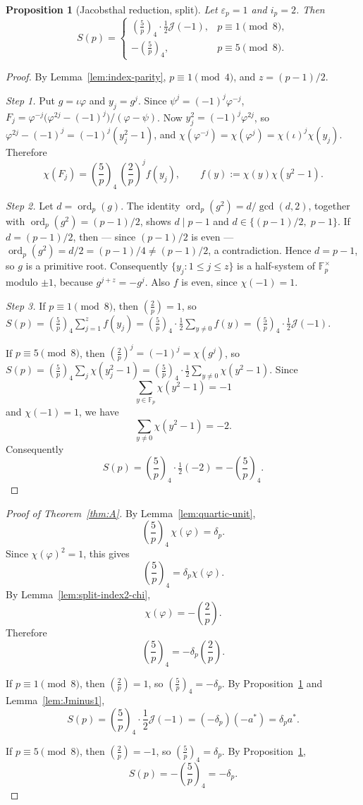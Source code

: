 \documentclass[11pt]{amsart}
\theoremstyle{plain}
\newtheorem{proposition}[theorem]{Proposition}
\theoremstyle{definition}
\newcommand{\Fp}{\mathbb{F}_p}
\newcommand{\leg}[2]{\left(\frac{#1}{#2}\right)}
\newcommand{\qleg}[2]{\left(\frac{#1}{#2}\right)_{\!4}}
\newcommand{\Jac}{\mathcal{J}}
\begin{document}
\begin{proposition}[Jacobsthal reduction, split]\label{prop:split-red}
Let $\varepsilon_p=1$ and $i_p=2$. Then
\[
  S(p)=\begin{cases}\qleg5p\cdot\tfrac12\Jac(-1), & p\equiv1\pmod8,\\[2pt] -\qleg5p, & p\equiv5\pmod8.\end{cases}
\]
\end{proposition}
\begin{proof}
By Lemma~\ref{lem:index-parity}, $p\equiv1\pmod4$, and $z=(p-1)/2$.

\emph{Step 1.} Put $g=\iota\varphi$ and $y_j=g^j$. Since
$\psi^j=(-1)^j\varphi^{-j}$,
$F_j=\varphi^{-j}\bigl(\varphi^{2j}-(-1)^j\bigr)/(\varphi-\psi)$. Now
$y_j^2=(-1)^j\varphi^{2j}$, so $\varphi^{2j}-(-1)^j=(-1)^j(y_j^2-1)$, and
$\chi(\varphi^{-j})=\chi(\varphi^{j})=\chi(\iota)^j\chi(y_j)$. Therefore
\[
  \chi(F_j)=\qleg5p\,\leg2p^{j} f(y_j),\qquad f(y):=\chi(y)\chi(y^2-1).
\]

\emph{Step 2.} Let $d=\operatorname{ord}_p(g)$. The identity
$\operatorname{ord}_p(g^2)=d/\gcd(d,2)$, together with
$\operatorname{ord}_p(g^2)=(p-1)/2$, shows $d\mid p-1$ and
$d\in\{(p-1)/2,\;p-1\}$. If $d=(p-1)/2$, then --- since $(p-1)/2$ is even
--- $\operatorname{ord}_p(g^2)=d/2=(p-1)/4\neq(p-1)/2$, a contradiction.
Hence $d=p-1$, so $g$ is a primitive root.
Consequently $\{y_j:1\le j\le z\}$ is a half-system of $\mathbb F_p^\times$
modulo $\pm1$, because $g^{j+z}=-g^j$. Also $f$ is even, since $\chi(-1)=1$.

\emph{Step 3.} If $p\equiv1\pmod 8$, then $\leg2p=1$, so
$S(p)=\qleg5p\sum_{j=1}^{z}f(y_j)=\qleg5p\cdot\tfrac12\sum_{y\neq0}f(y)
=\qleg5p\cdot\tfrac12\Jac(-1)$.

If $p\equiv5\pmod8$, then $\leg2p^{j}=(-1)^j=\chi(g^j)$, so
$S(p)=\qleg5p\sum_{j}\chi(y_j^2-1)=\qleg5p\cdot\tfrac12\sum_{y\ne0}\chi(y^2-1)$.
Since
\[
  \sum_{y\in\Fp}\chi(y^2-1)=-1
\]
and $\chi(-1)=1$, we have
\[
  \sum_{y\ne0}\chi(y^2-1)=-2.
\]
Consequently
\[
  S(p)=\qleg5p\cdot\tfrac12(-2)=-\qleg5p.
\]
\end{proof}

\begin{proof}[Proof of Theorem~\ref{thm:A}]
By Lemma~\ref{lem:quartic-unit},
\[
  \qleg5p\,\chi(\varphi)=\delta_p.
\]
Since $\chi(\varphi)^2=1$, this gives
\[
  \qleg5p=\delta_p\chi(\varphi).
\]
By Lemma~\ref{lem:split-index2-chi},
\[
  \chi(\varphi)=-\leg2p.
\]
Therefore
\[
  \qleg5p=-\delta_p\leg2p.
\]

If $p\equiv1\pmod8$, then $\leg2p=1$, so $\qleg5p=-\delta_p$.
By Proposition~\ref{prop:split-red} and Lemma~\ref{lem:Jminus1},
\[
  S(p)=\qleg5p\cdot\frac12\Jac(-1)
      =(-\delta_p)(-a^{*})
      =\delta_p a^{*}.
\]

If $p\equiv5\pmod8$, then $\leg2p=-1$, so $\qleg5p=\delta_p$.
By Proposition~\ref{prop:split-red},
\[
  S(p)=-\qleg5p=-\delta_p.
\]
\end{proof}
\end{document}

